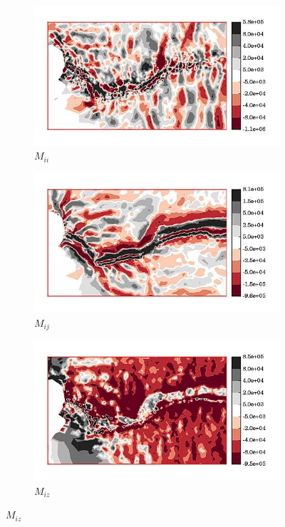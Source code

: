 \begin{figure}
  \begin{subfigure}[b]{0.32\linewidth}
    \includegraphics[width=\linewidth]{images/internal_energy/jakob_results/inversion_Wc_0.01/stress_balance/M_ii.jpg}
  \caption{$M_{ii}$}
  \label{M_ii}
  \end{subfigure}
  \begin{subfigure}[b]{0.32\linewidth}
    \includegraphics[width=\linewidth]{images/internal_energy/jakob_results/inversion_Wc_0.01/stress_balance/M_ij.jpg}
  \caption{$M_{ij}$}
  \label{M_ij}
  \end{subfigure}
  \begin{subfigure}[b]{0.32\linewidth}
    \includegraphics[width=\linewidth]{images/internal_energy/jakob_results/inversion_Wc_0.01/stress_balance/M_iz.jpg}
  \caption{$M_{iz}$}
  \label{M_iz}
  \end{subfigure}


\end{figure}
